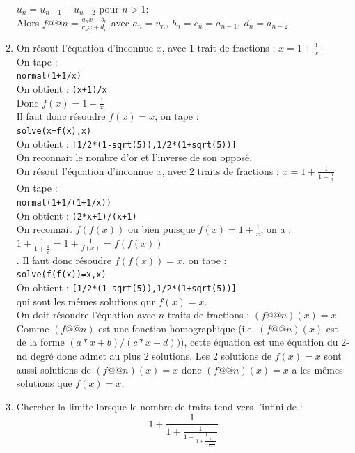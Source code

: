 \documentclass[a4paper,11pt]{book}
\begin{document}
\begin{enumerate}
$u_n=u_{n-1}+u_{n-2}$ pour $n>1$:\\
Alors 
$\displaystyle f@@ n=\frac{a_nx+b_n}{c_nx+d_n}$
avec $a_n=u_n,\ b_n=c_n=a_{n-1},\ d_n=a_{n-2}$
\item On r\'esout l'\'equation d'inconnue $x$, avec 1 trait de fractions :
$\displaystyle x=1+\frac{1}{x}$\\
On tape :\\
{\tt normal(1+1/x)}\\
On obtient : {\tt (x+1)/x}\\
Donc $\displaystyle f(x)=1+\frac{1}{x}$\\
Il faut donc r\'esoudre $f(x)=x$, on tape :\\
{\tt solve(x=f(x),x)}\\
On obtient : {\tt [1/2*(1-sqrt(5)),1/2*(1+sqrt(5))]}\\
On reconnait le nombre d'or et l'inverse de son oppos\'e.\\
On r\'esout l'\'equation d'inconnue $x$, avec 2 traits de fractions :
$x=1+\displaystyle \frac{1}{1+\displaystyle \frac{1}{x}}$\\
On tape :\\
{\tt normal(1+1/(1+1/x))}\\
On obtient : {\tt (2*x+1)/(x+1)}\\
On reconnait $f(f(x))$ ou bien 
puisque $\displaystyle f(x)=1+\frac{1}{x}$, on a :\\
$1+\displaystyle \frac{1}{1+\displaystyle \frac{1}{x}}=1+\frac{1}{f(x)}=f(f(x))$\\. 
Il faut donc r\'esoudre $f(f(x))=x$, on tape :\\
{\tt solve(f(f(x))=x,x)}\\
On obtient :
{\tt [1/2*(1-sqrt(5)),1/2*(1+sqrt(5))]}\\
qui sont les m\^emes solutions qur $f(x)=x$. \\
On doit r\'esoudre l'\'equation avec $n$ traits de fractions :
$(f@@ n)(x)=x$\\
Comme $(f@@ n)$ est une fonction homographique (i.e.
$(f@@ n)(x)$ est de la forme $(a*x+b)/(c*x+d))$),
cette \'equation est une \'equation du 2-nd degr\'e donc admet au plus 2 
solutions. Les 2 solutions de $f(x)=x$ sont aussi solutions de
$(f@@ n)(x)=x$ donc $(f@@ n)(x)=x$  a les m\^emes solutions que
$f(x)=x$.
\item Chercher la limite lorsque le nombre de traits tend vers l'infini de :
$$1+\frac{1}{1+\displaystyle\frac{1}{1+\displaystyle\frac{1}{1+\displaystyle\frac{1}{...\frac{1}{1+\displaystyle\frac{1}{a}}}}}}$$

\end{enumerate}
\end{document}
